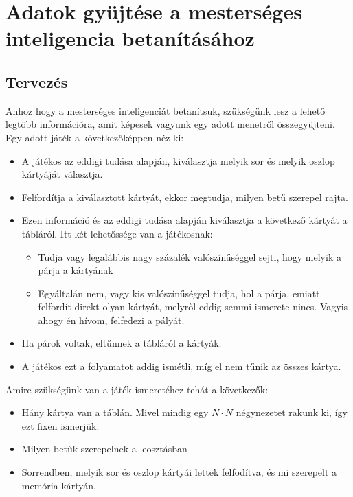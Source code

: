 \chapter{Adatok gyüjtése a mesterséges inteligencia betanításához}
\thispagestyle{fancy}
\pagestyle{fancy}


\section{Tervezés}
Ahhoz hogy a mesterséges inteligenciát betanítsuk, szükségünk lesz a lehető legtöbb információra, amit képesek vagyunk egy adott menetről összegyüjteni.
Egy adott játék a következőképpen néz ki:

\begin{itemize}
\item A játékos az eddigi tudása alapján, kiválasztja melyik sor és melyik oszlop kártyáját választja.
\item Felfordítja a kiválasztott kártyát, ekkor megtudja, milyen betű szerepel rajta. 
\item Ezen információ és az eddigi tudása alapján kiválasztja a következő kártyát a tábláról. Itt két lehetőssége van a játékosnak: 
\begin{itemize}
    \item Tudja vagy legalábbis nagy százalék valószínűséggel sejti, hogy melyik a párja a kártyának 
    \item Egyáltalán nem, vagy kis valószínűséggel tudja, hol a párja, emiatt felfordít direkt olyan kártyát, melyről eddig semmi ismerete nincs. Vagyis ahogy én hívom, felfedezi a pályát.
\end{itemize}
\item Ha párok voltak, eltűnnek a tábláról a kártyák.
\item A játékos ezt a folyamatot addig ismétli, míg el nem tűnik az összes kártya.
\end{itemize}

Amire szükségünk van a játék ismeretéhez tehát a következők: 
\begin{itemize}
    \item Hány kártya van a táblán. Mivel mindig egy $N \cdot N$ négynezetet rakunk ki, így ezt fixen ismerjük. 
    \item Milyen betűk szerepelnek a leosztásban
    \item Sorrendben, melyik sor és oszlop kártyái lettek felfodítva, és mi szerepelt a memória kártyán. 
\end{itemize}

